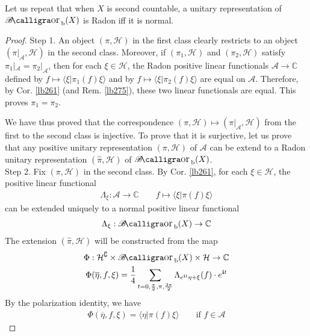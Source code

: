 \documentclass[12pt,b5paper,notitlepage]{article}
\theoremstyle{definition}
\theoremstyle{plain}
\DeclareMathOperator{\Borb}{{\mathscr{B}\text{\kern -2pt {\calligra\large or}}\,}_{\mathrm b}}
\newcommand{\wht}{\widehat}
\newcommand{\ovl}{\overline}
\newcommand{\bk}[1]{\langle {#1}\rangle}
\newcommand{\scr}{\mathscr}
\newcommand{\im}{\mathbf{i}}
\newcommand{\Co}{\complement}
\newcommand{\Cbb}{\mathbb C}
\newcommand{\MH}{\mathcal H}
\numberwithin{equation}{section}
\begin{document}
Let us repeat that when $X$ is second countable, a unitary representation of $\Borb(X)$ is Radon iff it is normal.

\begin{proof}
Step 1. An object $(\pi,\MH)$ in the first class clearly restricts to an object $(\pi|_{\scr A},\MH)$ in the second class. Moreover, if $(\pi_1,\MH)$ and $(\pi_2,\MH)$ satisfy $\pi_1|_{\scr A}=\pi_2|_{\scr A}$, then for each $\xi\in \MH$, the Radon positive linear functionals $\scr A\rightarrow\Cbb$ defined by $f\mapsto\bk{\xi|\pi_1(f)\xi}$ and by $f\mapsto\bk{\xi|\pi_2(f)\xi}$ are equal on $\scr A$. Therefore, by Cor. \ref{lb261} (and Rem. \ref{lb275}), these two linear functionals are equal. This proves $\pi_1=\pi_2$.

We have thus proved that the correspondence $(\pi,\MH)\mapsto(\pi|_{\scr A},\MH)$ from the first to the second class is injective. To prove that it is surjective, let us prove that any positive unitary representation $(\pi,\MH)$ of $\scr A$ can be extend to a Radon unitary representation $(\wht\pi,\MH)$ of $\Borb(X)$.\\[-1ex]

Step 2. Fix $(\pi,\MH)$ in the second class. By Cor. \ref{lb261}, for each $\xi\in \MH$, the positive linear functional
\begin{align}\label{eq154}
\Lambda_\xi:\scr A\rightarrow\Cbb\qquad f\mapsto\bk{\xi|\pi(f)\xi}
\end{align}
can be extended uniquely to a normal positive linear functional
\begin{align*}
\Lambda_\xi:\Borb(X)\rightarrow\Cbb
\end{align*}
The extension $(\wht\pi,\MH)$ will be constructed from the map
\begin{gather}\label{eq150}
\begin{gathered}
\Phi:\MH^\Co\times \Borb(X)\times \MH\rightarrow\Cbb\\
\Phi(\ovl\eta,f,\xi)=\frac 14\sum_{t=0,\frac \pi 2,\pi,\frac{3\pi}2}\Lambda_{e^{\im t}\eta+\xi}(f)\cdot e^{\im t}
\end{gathered}
\end{gather}
By the polarization identity, we have
\begin{align}\label{eq152}
\Phi(\ovl\eta,f,\xi)=\bk{\eta|\pi(f)\xi}\qquad\text{if }f\in\scr A
\end{align}


\end{proof}
\end{document}
